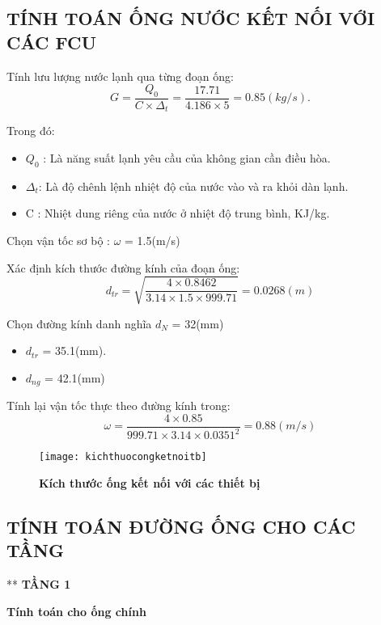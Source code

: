 \subsection{TÍNH TOÁN ỐNG NƯỚC KẾT NỐI VỚI CÁC FCU }
Tính lưu lượng nước lạnh qua từng đoạn ống:
\begin{equation*}
	G = \dfrac{Q_{0}}{C \times \Delta_{t}} =\dfrac{17.71}{4.186 \times 5} = 0.85(kg/s).
\end{equation*}

Trong đó:
\begin{itemize}
	\item $Q_{0}$ : Là năng suất lạnh yêu cầu của không gian cần điều hòa.
	\item $\Delta_{t}$: Là độ chênh lệnh nhiệt độ của nước vào và ra khỏi dàn lạnh.
	\item C : Nhiệt dung riêng của nước ở nhiệt độ trung bình, KJ/kg.
\end{itemize}

Chọn vận tốc sơ bộ : $\omega$ = 1.5(m/s)

Xác định kích thước đường kính của đoạn ống:
\begin{equation*}
	d_{tr} = \sqrt{\dfrac{4 \times 0.8462}{3.14 \times 1.5 \times 999.71}} = 0.0268(m)
\end{equation*}

Chọn đường kính danh nghĩa $d_{N}$ = 32(mm)
\begin{itemize}
	\item $d_{tr}$ = 35.1(mm).
	\item $d_{ng}$ = 42.1(mm)
\end{itemize}

Tính lại vận tốc thực theo đường kính trong:
\begin{equation*}
	\omega = \dfrac{4 \times 0.85 }{999.71 \times 3.14 \times 0.0351^{2}} = 0.88(m/s)
\end{equation*}

\begin{figure}[H]
	\centering
	\texttt{[image: kichthuocongketnoitb]}
	\caption{\textbf{Kích thước ống kết nối với các thiết bị}}
	\label{kichthuocongketnoitb}	 
\end{figure}

\subsection{TÍNH TOÁN ĐƯỜNG ỐNG CHO CÁC TẦNG}
** \textbf{TẦNG 1}

\textbf{Tính toán cho ống chính}

